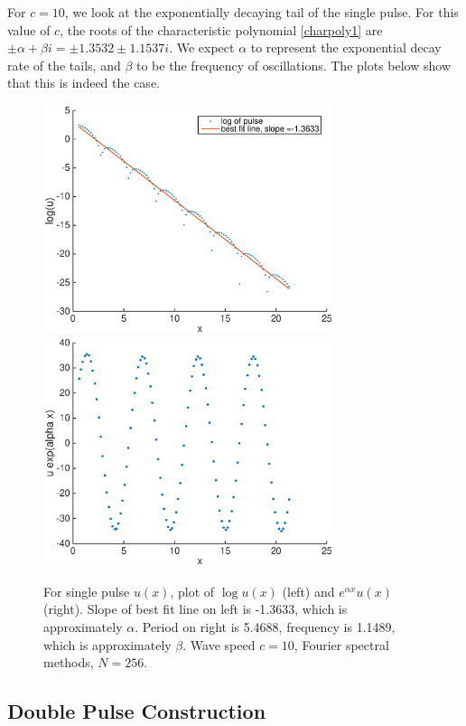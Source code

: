 \documentclass[12pt]{article}
\begin{document}
For $c = 10$, we look at the exponentially decaying tail of the single pulse. For this value of $c$, the roots of the characteristic polynomial \eqref{charpoly1} are $\pm \alpha + \beta i = \pm1.3532 \pm 1.1537i$. We expect $\alpha$ to represent the exponential decay rate of the tails, and $\beta$ to be the frequency of oscillations. The plots below show that this is indeed the case.

\begin{figure}[H]
	\includegraphics[width=8.5cm]{decaysinglepulse.eps}
	\includegraphics[width=8.5cm]{oscsinglepulse.eps}
	\caption{For single pulse $u(x)$, plot of $\log u(x)$ (left) and $e^{\alpha x} u(x)$ (right). Slope of best fit line on left is -1.3633, which is approximately $\alpha$. Period on right is 5.4688, frequency is 1.1489, which is approximately $\beta$. Wave speed $c = 10$, Fourier spectral methods, $N = 256$.}
\end{figure}

\subsection{Double Pulse Construction}
\end{document}

